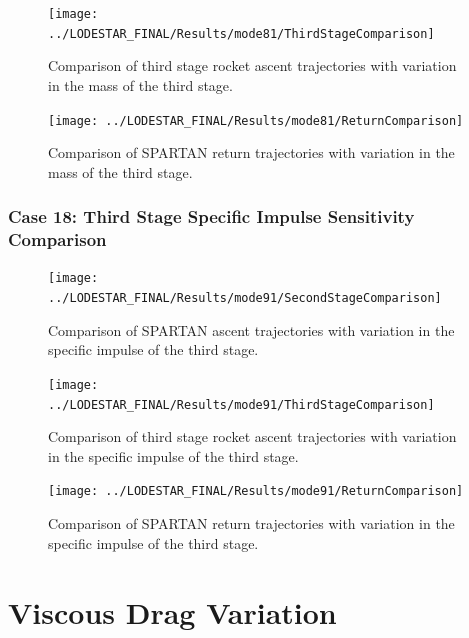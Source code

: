 \begin{figure}[!th]
\centering
\texttt{[image: ../LODESTAR\_FINAL/Results/mode81/ThirdStageComparison]}
\caption{Comparison of third stage rocket ascent trajectories with variation in the mass of the third stage.}
\label{fig:ThirdStageComparison14}
\end{figure}



\begin{figure}[!th]
	\centering
	\texttt{[image: ../LODESTAR\_FINAL/Results/mode81/ReturnComparison]}
	\caption{Comparison of SPARTAN return trajectories with variation in the mass of the third stage.}
	\label{fig:ReturnComparison14}
\end{figure}
\FloatBarrier
\clearpage
\subsection{Case 18: Third Stage Specific Impulse Sensitivity Comparison}\label{sec:app_comparison91}

\begin{figure}[!th]
\centering
\texttt{[image: ../LODESTAR\_FINAL/Results/mode91/SecondStageComparison]}
\caption{Comparison of SPARTAN ascent trajectories with variation in the specific impulse of the third stage.}
\label{fig:SecondStageComparison15}
\end{figure}


\begin{figure}[!th]
\centering
\texttt{[image: ../LODESTAR\_FINAL/Results/mode91/ThirdStageComparison]}
\caption{Comparison of third stage rocket ascent trajectories with variation in the specific impulse of the third stage.}
\label{fig:ThirdStageComparison15}
\end{figure}


\begin{figure}[!th]
\centering
\texttt{[image: ../LODESTAR\_FINAL/Results/mode91/ReturnComparison]}
\caption{Comparison of SPARTAN return trajectories with variation in the specific impulse of the third stage.}
\label{fig:ReturnComparison15}
\end{figure}


\chapter{Viscous Drag Variation}


